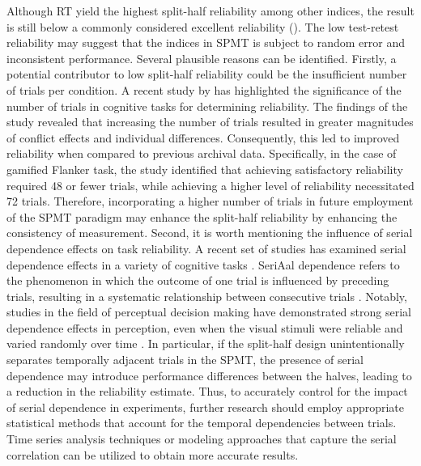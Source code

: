 \documentclass[sn-apa]{sn-jnl}%
\theoremstyle{thmstyleone}%
\theoremstyle{thmstyletwo}%
\theoremstyle{thmstylethree}%
\begin{document}
Although RT yield the highest split-half reliability among other indices, the result is still below a commonly considered excellent reliability (). The low test-retest reliability may suggest that the indices in SPMT is subject to random error and inconsistent performance. Several plausible reasons can be identified. Firstly, a potential contributor to low split-half reliability could be the insufficient number of trials per condition. A recent study by \textcite{kucina2023calibration} has highlighted the significance of the number of trials in cognitive tasks for determining reliability. The findings of the study revealed that increasing the number of trials resulted in greater magnitudes of conflict effects and individual differences. Consequently, this led to improved reliability when compared to previous archival data. Specifically, in the case of gamified Flanker task, the study identified that achieving satisfactory reliability required 48 or fewer trials, while achieving a higher level of reliability necessitated 72 trials. Therefore, incorporating a higher number of trials in future employment of the SPMT paradigm may enhance the split-half reliability by enhancing the consistency of measurement. Second, it is worth mentioning the influence of serial dependence effects on task reliability. A recent set of studies has examined serial dependence effects in a variety of cognitive tasks \parencite{zhang2020individual, braun2018adaptive}. SeriAal dependence refers to the phenomenon in which the outcome of one trial is influenced by preceding trials, resulting in a systematic relationship between consecutive trials \parencite{pascucci2023serial}.  Notably, studies in the field of perceptual decision making have demonstrated strong serial dependence effects in perception, even when the visual stimuli were reliable and varied randomly over time \parencite{fischer2014serial,john2016serial}. In particular, if the split-half design unintentionally separates temporally adjacent trials in the SPMT, the presence of serial dependence may introduce performance differences between the halves, leading to a reduction in the reliability estimate. Thus, to accurately control for the impact of serial dependence in experiments, further research should employ appropriate statistical methods that account for the temporal dependencies between trials. Time series analysis techniques \parencite{huitema1986autocorrelation} or modeling approaches that capture the serial correlation \parencite{mei2023using} can be utilized to obtain more accurate results. 
\end{document}
